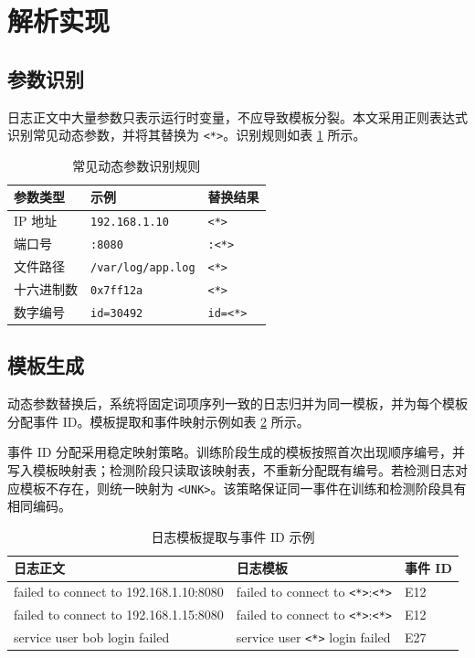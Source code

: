 \section{解析实现}

\subsection{参数识别}

日志正文中大量参数只表示运行时变量，不应导致模板分裂。本文采用正则表达式识别常见动态参数，并将其替换为 \texttt{<*>}。识别规则如表 \ref{tab:dynamic_parameter_rules_revised} 所示。

\begin{table}[htbp]
    \centering
    \caption{常见动态参数识别规则}
    \label{tab:dynamic_parameter_rules_revised}
    \begin{tabular}{p{3cm}p{5cm}p{3cm}}
        \hline
        \textbf{参数类型} & \textbf{示例} & \textbf{替换结果} \\
        \hline
        IP 地址 & \texttt{192.168.1.10} & \texttt{<*>} \\
        端口号 & \texttt{:8080} & \texttt{:<*>} \\
        文件路径 & \texttt{/var/log/app.log} & \texttt{<*>} \\
        十六进制数 & \texttt{0x7ff12a} & \texttt{<*>} \\
        数字编号 & \texttt{id=30492} & \texttt{id=<*>} \\
        \hline
    \end{tabular}
\end{table}

\subsection{模板生成}

动态参数替换后，系统将固定词项序列一致的日志归并为同一模板，并为每个模板分配事件 ID。模板提取和事件映射示例如表 \ref{tab:template_event_example_revised} 所示。

事件 ID 分配采用稳定映射策略。训练阶段生成的模板按照首次出现顺序编号，并写入模板映射表；检测阶段只读取该映射表，不重新分配既有编号。若检测日志对应模板不存在，则统一映射为 \texttt{<UNK>}。该策略保证同一事件在训练和检测阶段具有相同编码。

\begin{table}[htbp]
    \centering
    \caption{日志模板提取与事件 ID 示例}
    \label{tab:template_event_example_revised}
    \begin{tabular}{p{5.2cm}p{4.8cm}p{1.5cm}}
        \hline
        \textbf{日志正文} & \textbf{日志模板} & \textbf{事件 ID} \\
        \hline
        failed to connect to 192.168.1.10:8080 & failed to connect to \texttt{<*>}:\texttt{<*>} & E12 \\
        failed to connect to 192.168.1.15:8080 & failed to connect to \texttt{<*>}:\texttt{<*>} & E12 \\
        service user bob login failed & service user \texttt{<*>} login failed & E27 \\
        \hline
    \end{tabular}
\end{table}

